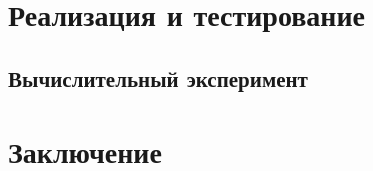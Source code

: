\documentclass{fefu}
\begin{document}
  \section{Реализация и тестирование}
  
  \subsection{Вычислительный эксперимент}
  

  \section*{Заключение}
  

  \newpage
  \nocite{*} %
  
  
\end{document}
